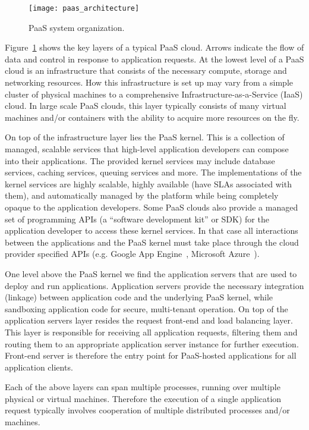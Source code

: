 \begin{figure}
\centering
\texttt{[image: paas\_architecture]}
\caption{PaaS system organization.}
\label{fig:paas_architecture}
\end{figure}

Figure~\ref{fig:paas_architecture} shows the key layers of a typical PaaS cloud. Arrows indicate
the flow of data and control in response to application requests.
At the lowest level of a PaaS cloud is an infrastructure that consists of the necessary compute, storage
and networking resources. How this infrastructure is set up may vary from a simple cluster of physical 
machines to a comprehensive Infrastructure-as-a-Service (IaaS) cloud. In large scale PaaS clouds,
this layer typically consists of many virtual machines and/or containers with the ability to acquire more
resources on the fly.

On top of the infrastructure layer lies the PaaS kernel. This is a collection of managed, scalable
services that high-level application developers can compose into their applications. The provided kernel services
may include database services, caching services, queuing services and more. 
The implementations of the kernel services are highly scalable, highly available (have SLAs associated with them),
and automatically managed by the platform while being completely opaque
to the application developers. Some PaaS clouds
also provide a managed set of programming APIs (a ``software development
kit'' or SDK) for the application developer to access these kernel services. 
In that case all interactions between the applications and the PaaS kernel must take place through
the cloud provider specified APIs (e.g. Google App Engine~\cite{gae}, Microsoft Azure~\cite{azure}). 

One level above the PaaS kernel we find the application servers that are used to deploy and run
applications. Application servers provide the necessary integration (linkage) between application code and the
underlying PaaS kernel, while sandboxing application code for secure, multi-tenant operation. On top
of the application servers layer resides the request
front-end and load balancing layer. This layer is responsible
for receiving all application requests, filtering them and routing them to an appropriate application
server instance for further execution. Front-end server is therefore the entry point for PaaS-hosted
applications for all application clients.

Each of the above layers can span multiple processes, running over multiple physical or virtual
machines. Therefore the execution of a single application request typically involves cooperation
of multiple distributed processes and/or machines.

